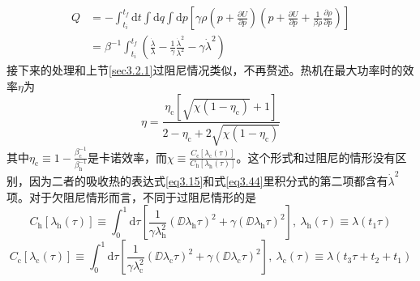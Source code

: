 \begin{equation}
    \begin{split}
        Q &=-\int_{t_i}^{t_f} \mathrm{d} t \int \mathrm{d} q \int \mathrm{d} p\left[\gamma \rho\left(p+\frac{\partial U}{\partial p}\right)\left(p+\frac{\partial U}{\partial p}+\frac{1}{\beta \rho} \frac{\partial \rho}{\partial p}\right)\right]\\
        &=\beta^{-1} \int_{t_i}^{t_f} \left(\frac{\dot{\lambda}}{\lambda}-\frac{1}{\gamma} \frac{\dot{\lambda}^{2}}{\lambda^{2}}-\gamma \dot{\lambda}^{2}\right)
    \end{split}
    \label{eq3.44}
\end{equation}
接下来的处理和上节\ref{sec3.2.1}过阻尼情况类似，不再赘述。热机在最大功率时的效率$\eta$为
\begin{equation}
    \eta=\frac{\eta_{\mathrm{c}}\left[\sqrt{\chi(1-\eta_{\mathrm{c}})}+1\right]}{2-\eta_{\mathrm{c}}+2 \sqrt{\chi\left(1-\eta_{\mathrm{c}}\right)}}
    \label{eq3.45}
\end{equation}
其中$\eta_{\mathrm{c}}\equiv 1-\frac{\beta_{\mathrm{c}}^{-1}}{\beta_{\mathrm{h}}^{-1}}$是卡诺效率，而$\chi\equiv\frac{C_{\mathrm{c}} [\lambda_{\mathrm{c}}(\tau)]}{C_{\mathrm{h}} [\lambda_{\mathrm{h}}(\tau)]}$。这个形式和过阻尼的情形没有区别，因为二者的吸收热的表达式\eqref{eq3.15}和式\eqref{eq3.44}里积分式的第二项都含有$\dot{\lambda}^2$项。对于欠阻尼情形而言，不同于过阻尼情形的是
\begin{equation}
    C_{\mathrm{h}} [\lambda_{\mathrm{h}}(\tau)]\equiv \int_{{0}}^{{1}} \mathrm{d} \tau \left[\frac{1}{\gamma{\lambda_{\mathrm{h}}^{2}}} \left(\DD{{\lambda_{\mathrm{h}}}}{\tau}\right)^{2}+\gamma \left({\DD{\lambda_{\mathrm{h}}}{\tau}}\right)^{2} \right],\ \lambda_{\mathrm{h}}(\tau)\equiv\lambda(t_1 \tau)
    \label{eq3.46}
\end{equation}
\begin{equation}
    C_{\mathrm{c}} [\lambda_{\mathrm{c}}(\tau)]\equiv \int_{{0}}^{{1}} \mathrm{d} \tau \left[\frac{1}{\gamma{\lambda_{\mathrm{c}}^{2}}} \left(\DD{{\lambda_{\mathrm{c}}}}{\tau}\right)^{2}+\gamma \left({\DD{\lambda_{\mathrm{c}}}{\tau}}\right)^{2} \right],\ \lambda_{\mathrm{c}}(\tau)\equiv\lambda(t_3 \tau + t_2 +t_1)
    \label{eq3.46.5}
\end{equation}

